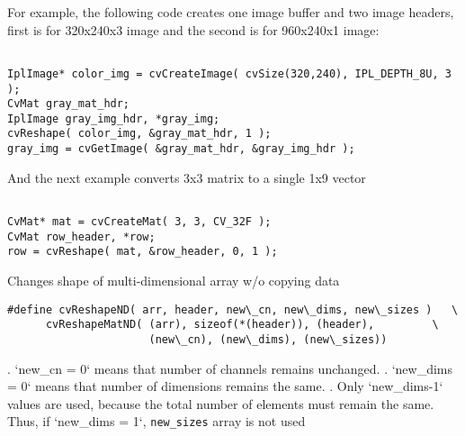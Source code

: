 For example, the following code creates one image buffer and two image headers, first is for 320x240x3 image and the second is for 960x240x1 image:

\begin{lstlisting}

IplImage* color_img = cvCreateImage( cvSize(320,240), IPL_DEPTH_8U, 3 );
CvMat gray_mat_hdr;
IplImage gray_img_hdr, *gray_img;
cvReshape( color_img, &gray_mat_hdr, 1 );
gray_img = cvGetImage( &gray_mat_hdr, &gray_img_hdr );

\end{lstlisting}

And the next example converts 3x3 matrix to a single 1x9 vector

\begin{lstlisting}

CvMat* mat = cvCreateMat( 3, 3, CV_32F );
CvMat row_header, *row;
row = cvReshape( mat, &row_header, 0, 1 );

\end{lstlisting}


Changes shape of multi-dimensional array w/o copying data


\begin{lstlisting}
#define cvReshapeND( arr, header, new\_cn, new\_dims, new\_sizes )   \
      cvReshapeMatND( (arr), sizeof(*(header)), (header),         \
                      (new\_cn), (new\_dims), (new\_sizes))
\end{lstlisting}


\begin{description}
\cvarg{new\_cn}{New number of channels}
. `new\_cn = 0` means that number of channels remains unchanged.
. `new\_dims = 0` means that number of dimensions remains the same.
. Only `new\_dims-1` values are used, because the total number of elements must remain the same. Thus, if `new\_dims = 1`, \texttt{new\_sizes} array is not used
\end{description}

